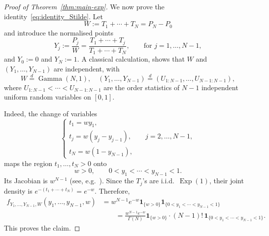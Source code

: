 \documentclass[a4paper,reqno,11pt]{amsart}
\numberwithin{equation}{section}
\numberwithin{thm}{section}
\theoremstyle{plain}
\theoremstyle{definition}
\begin{document}
{\begin{proof}[Proof of Theorem~\ref{thm:main-exp}]
\par

We now prove the  identity~\eqref{eq:identity_Stilde}. 
Let
\begin{equation}
    W:=T_1+\cdots+T_N=P_N-P_0
\end{equation}
and introduce the normalised points
\begin{equation}
    Y_j:=\frac{P_j}{W}
    =\frac{T_1+\cdots+T_j}{T_1+\cdots+T_N},
    \qquad \text{for $j=1,\ldots,N-1$},
\end{equation}
and $Y_0:=0$ and $Y_N:=1$. 
A classical calculation, shows that $W$ and $(Y_1,\ldots,Y_{N-1})$ are independent, with
\begin{equation}
    W\stackrel{d}{=}\operatorname{Gamma}(N,1),\quad     (Y_1,\ldots,Y_{N-1})
    \stackrel{d}{=}
    (U_{1:N-1},\ldots,U_{N-1:N-1}),
\end{equation}
where $U_{1:N-1}<\cdots<U_{N-1:N-1}$ are the order statistics of
$N-1$ independent uniform random variables on $[0,1]$.

Indeed, the change of variables
\begin{equation}
\begin{cases}
    t_1 = w y_1,\\
    t_j = w(y_j-y_{j-1}), \qquad j=2,\ldots,N-1,\\
    t_N = w(1-y_{N-1}),
\end{cases}
\end{equation}
maps the region $t_1,\ldots,t_N>0$ onto
\begin{equation}
    w>0,\qquad 0<y_1<\cdots<y_{N-1}<1.
\end{equation}
Its Jacobian is $w^{N-1}$ (see, e.g.~\cite[Appendix B.1]{Cunden20}). Since the $T_j$'s are i.i.d.\
$\operatorname{Exp}(1)$, their joint density is $e^{-(t_1+\cdots+t_N)}
    =e^{-w}$.    
Therefore,
\begin{equation}
\begin{aligned}
f_{Y_1,\ldots,Y_{N-1},W}(y_1,\ldots,y_{N-1},w) &=
w^{N-1}e^{-w}
\bm 1_{\{w>0\}}
\bm 1_{\{0<y_1<\cdots<y_{N-1}<1\}}  \\
&\qquad =
\frac{w^{N-1}e^{-w}}{\Gamma(N)}
\bm 1_{\{w>0\}}
\cdot
(N-1)!\,
\bm 1_{\{0<y_1<\cdots<y_{N-1}<1\}}.
\end{aligned}
\end{equation}
This proves the claim.


\end{proof}}
\end{document}
